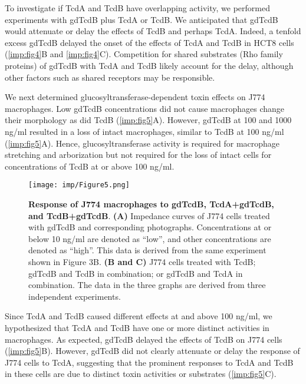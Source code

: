 To investigate if TcdA and TcdB have overlapping activity, 
we performed experiments with gdTcdB plus TcdA or TcdB. We 
anticipated that gdTcdB would attenuate or delay the effects 
of TcdB and perhaps TcdA. Indeed, a tenfold excess gdTcdB 
delayed the onset of the effects of TcdA and TcdB in HCT8 
cells (\autoref{imp:fig4}B and \autoref{imp:fig4}C). 
Competition for shared substrates 
(Rho family proteins) of gdTcdB with TcdA and TcdB likely 
account for the delay, although other factors such as 
shared receptors may be responsible.

We next determined glucosyltransferase-dependent toxin effects 
on J774 macrophages. Low gdTcdB concentrations did not cause 
macrophages change their morphology as did TcdB (\autoref{imp:fig5}A). 
However, gdTcdB at 100 and 1000 ng/ml resulted in a loss 
of intact macrophages, similar to TcdB at 100 ng/ml 
(\autoref{imp:fig5}A). Hence, glucosyltransferase activity is 
required for macrophage stretching and arborization 
but not required for the loss of intact cells for 
concentrations of TcdB at or above 100 ng/ml.

\begin{figure}[h!]
  \centering
  \texttt{[image: imp/Figure5.png]}
  \caption[Response of J774 macrophages to gdTcdB, 
             TcdA+gdTcdB, and TcdB+gdTcdB]{
       \textbf{Response of J774 macrophages to 
               gdTcdB, TcdA+gdTcdB, and TcdB+gdTcdB}.
    \textbf{(A)} Impedance curves of J774 cells treated with gdTcdB 
    and corresponding photographs. Concentrations 
    at or below 10 ng/ml are denoted as ``low'', and 
    other concentrations are denoted as ``high''. This 
    data is derived from the same experiment shown in 
    Figure 3B. 
    \textbf{(B and C)} J774 cells treated with TcdB; gdTcdB and 
    TcdB in combination; or gdTcdB and TcdA in 
    combination. The data in the three graphs are 
    derived from three independent experiments.
  }
  \label{imp:fig5}
\end{figure}


Since TcdA and TcdB caused different effects at and 
above 100 ng/ml, we hypothesized that TcdA and TcdB 
have one or more distinct activities in macrophages. 
As expected, gdTcdB delayed the effects of TcdB on 
J774 cells (\autoref{imp:fig5}B). However, gdTcdB did not clearly 
attenuate or delay the response of J774 cells to TcdA, 
suggesting that the prominent responses to TcdA and 
TcdB in these cells are due to distinct toxin activities 
or substrates (\autoref{imp:fig5}C).

